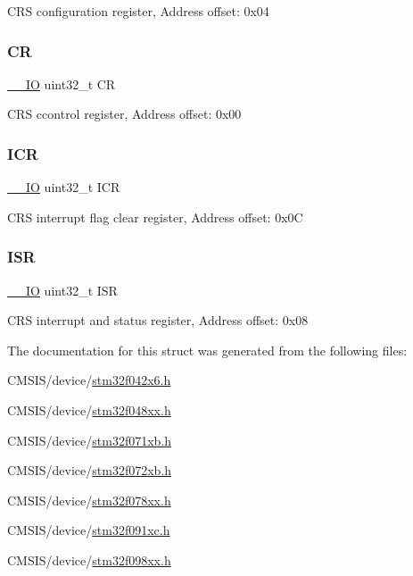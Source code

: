 C\+RS configuration register, Address offset\+: 0x04 \mbox{\label{struct_c_r_s___type_def_ab40c89c59391aaa9d9a8ec011dd0907a}} 
\subsubsection{\texorpdfstring{CR}{CR}}
{\footnotesize\ttfamily \hyperlink{core__sc300_8h_aec43007d9998a0a0e01faede4133d6be}{\+\_\+\+\_\+\+IO} uint32\+\_\+t CR}

C\+RS ccontrol register, Address offset\+: 0x00 \mbox{\label{struct_c_r_s___type_def_a0a8c8230846fd8ff154b9fde8dfa0399}} 
\subsubsection{\texorpdfstring{I\+CR}{ICR}}
{\footnotesize\ttfamily \hyperlink{core__sc300_8h_aec43007d9998a0a0e01faede4133d6be}{\+\_\+\+\_\+\+IO} uint32\+\_\+t I\+CR}

C\+RS interrupt flag clear register, Address offset\+: 0x0C \mbox{\label{struct_c_r_s___type_def_ab3c49a96815fcbee63d95e1e74f20e75}} 
\subsubsection{\texorpdfstring{I\+SR}{ISR}}
{\footnotesize\ttfamily \hyperlink{core__sc300_8h_aec43007d9998a0a0e01faede4133d6be}{\+\_\+\+\_\+\+IO} uint32\+\_\+t I\+SR}

C\+RS interrupt and status register, Address offset\+: 0x08 

The documentation for this struct was generated from the following files\+:\begin{DoxyCompactItemize}
\item 
C\+M\+S\+I\+S/device/\hyperlink{stm32f042x6_8h}{stm32f042x6.\+h}\item 
C\+M\+S\+I\+S/device/\hyperlink{stm32f048xx_8h}{stm32f048xx.\+h}\item 
C\+M\+S\+I\+S/device/\hyperlink{stm32f071xb_8h}{stm32f071xb.\+h}\item 
C\+M\+S\+I\+S/device/\hyperlink{stm32f072xb_8h}{stm32f072xb.\+h}\item 
C\+M\+S\+I\+S/device/\hyperlink{stm32f078xx_8h}{stm32f078xx.\+h}\item 
C\+M\+S\+I\+S/device/\hyperlink{stm32f091xc_8h}{stm32f091xc.\+h}\item 
C\+M\+S\+I\+S/device/\hyperlink{stm32f098xx_8h}{stm32f098xx.\+h}\end{DoxyCompactItemize}
